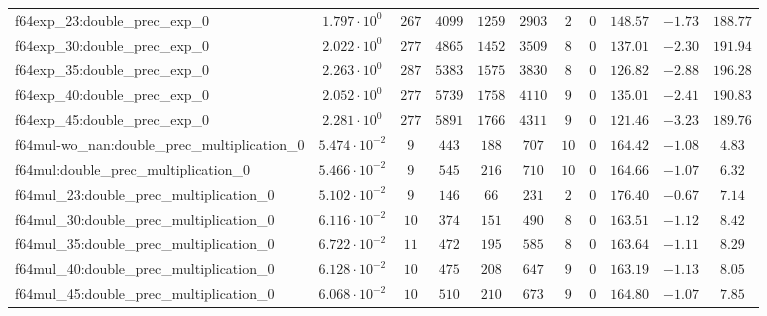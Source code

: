 \begin{tabular}{|l|c|c|c|c|c|c|c|c|c|c|}
f64exp\_23:double\_prec\_exp\_0                & $ 1.797 \cdot 10^{0}  $ & $ 267    $ & $ 4099   $ & $ 1259  $ & $ 2903   $ & $ 2   $ & $ 0 $ & $ 148.57      $ & $ -1.73   $ & $ 188.77  $ \\
f64exp\_30:double\_prec\_exp\_0                & $ 2.022 \cdot 10^{0}  $ & $ 277    $ & $ 4865   $ & $ 1452  $ & $ 3509   $ & $ 8   $ & $ 0 $ & $ 137.01      $ & $ -2.30   $ & $ 191.94  $ \\
f64exp\_35:double\_prec\_exp\_0                & $ 2.263 \cdot 10^{0}  $ & $ 287    $ & $ 5383   $ & $ 1575  $ & $ 3830   $ & $ 8   $ & $ 0 $ & $ 126.82      $ & $ -2.88   $ & $ 196.28  $ \\
f64exp\_40:double\_prec\_exp\_0                & $ 2.052 \cdot 10^{0}  $ & $ 277    $ & $ 5739   $ & $ 1758  $ & $ 4110   $ & $ 9   $ & $ 0 $ & $ 135.01      $ & $ -2.41   $ & $ 190.83  $ \\
f64exp\_45:double\_prec\_exp\_0                & $ 2.281 \cdot 10^{0}  $ & $ 277    $ & $ 5891   $ & $ 1766  $ & $ 4311   $ & $ 9   $ & $ 0 $ & $ 121.46      $ & $ -3.23   $ & $ 189.76  $ \\
f64mul-wo\_nan:double\_prec\_multiplication\_0 & $ 5.474 \cdot 10^{-2} $ & $ 9      $ & $ 443    $ & $ 188   $ & $ 707    $ & $ 10  $ & $ 0 $ & $ 164.42      $ & $ -1.08   $ & $ 4.83    $ \\
f64mul:double\_prec\_multiplication\_0         & $ 5.466 \cdot 10^{-2} $ & $ 9      $ & $ 545    $ & $ 216   $ & $ 710    $ & $ 10  $ & $ 0 $ & $ 164.66      $ & $ -1.07   $ & $ 6.32    $ \\
f64mul\_23:double\_prec\_multiplication\_0     & $ 5.102 \cdot 10^{-2} $ & $ 9      $ & $ 146    $ & $ 66    $ & $ 231    $ & $ 2   $ & $ 0 $ & $ 176.40      $ & $ -0.67   $ & $ 7.14    $ \\
f64mul\_30:double\_prec\_multiplication\_0     & $ 6.116 \cdot 10^{-2} $ & $ 10     $ & $ 374    $ & $ 151   $ & $ 490    $ & $ 8   $ & $ 0 $ & $ 163.51      $ & $ -1.12   $ & $ 8.42    $ \\
f64mul\_35:double\_prec\_multiplication\_0     & $ 6.722 \cdot 10^{-2} $ & $ 11     $ & $ 472    $ & $ 195   $ & $ 585    $ & $ 8   $ & $ 0 $ & $ 163.64      $ & $ -1.11   $ & $ 8.29    $ \\
f64mul\_40:double\_prec\_multiplication\_0     & $ 6.128 \cdot 10^{-2} $ & $ 10     $ & $ 475    $ & $ 208   $ & $ 647    $ & $ 9   $ & $ 0 $ & $ 163.19      $ & $ -1.13   $ & $ 8.05    $ \\
f64mul\_45:double\_prec\_multiplication\_0     & $ 6.068 \cdot 10^{-2} $ & $ 10     $ & $ 510    $ & $ 210   $ & $ 673    $ & $ 9   $ & $ 0 $ & $ 164.80      $ & $ -1.07   $ & $ 7.85    $ \\

\end{tabular}
